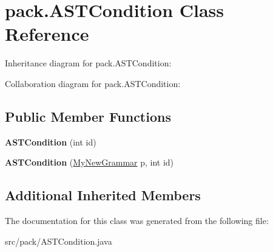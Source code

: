 \hypertarget{classpack_1_1_a_s_t_condition}{}\section{pack.\+A\+S\+T\+Condition Class Reference}
\label{classpack_1_1_a_s_t_condition}


Inheritance diagram for pack.\+A\+S\+T\+Condition\+:


Collaboration diagram for pack.\+A\+S\+T\+Condition\+:
\subsection*{Public Member Functions}
\begin{DoxyCompactItemize}
\item 
{\bfseries A\+S\+T\+Condition} (int id)\hypertarget{classpack_1_1_a_s_t_condition_a2fce6d9181d5272632b38b56859faee4}{}\label{classpack_1_1_a_s_t_condition_a2fce6d9181d5272632b38b56859faee4}

\item 
{\bfseries A\+S\+T\+Condition} (\hyperlink{classpack_1_1_my_new_grammar}{My\+New\+Grammar} p, int id)\hypertarget{classpack_1_1_a_s_t_condition_ae6c7a7553d61e3b148510a6e21c68ff0}{}\label{classpack_1_1_a_s_t_condition_ae6c7a7553d61e3b148510a6e21c68ff0}

\end{DoxyCompactItemize}
\subsection*{Additional Inherited Members}


The documentation for this class was generated from the following file\+:\begin{DoxyCompactItemize}
\item 
src/pack/A\+S\+T\+Condition.\+java\end{DoxyCompactItemize}

